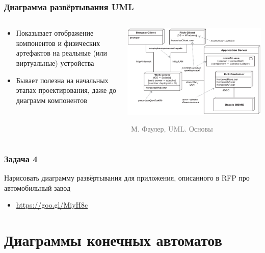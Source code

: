 \documentclass[xetex,mathserif,serif]{beamer}
\newcommand{\attribution}[1] {
	\vspace{-5mm}\begin{flushright}\begin{scriptsize}\textcolor{gray}{\textcopyright\, #1}\end{scriptsize}\end{flushright}
}
\begin{document}
	\begin{frame}
		\frametitle{Диаграмма развёртывания UML}
		\begin{columns}
			\begin{column}{0.5\textwidth}
				\begin{itemize}
					\item Показывает отображение компонентов и физических артефактов на реальные (или виртуальные) устройства
					\item Бывает полезна на начальных этапах проектирования, даже до диаграмм компонентов
				\end{itemize}
			\end{column}
			\begin{column}{0.5\textwidth}
				\begin{center}
					\includegraphics[width=\textwidth]{deploymentDiagram.png}
					\attribution{М. Фаулер, UML. Основы}
				\end{center}
			\end{column}
		\end{columns}
	\end{frame}

	\begin{frame}
		\frametitle{Задача 4}
		Нарисовать диаграмму развёртывания для приложения, описанного в RFP про автомобильный завод
		\begin{itemize}
			\item \url{https://goo.gl/MiyH8c}
		\end{itemize}
	\end{frame}

	\section{Диаграммы конечных автоматов}
\end{document}
